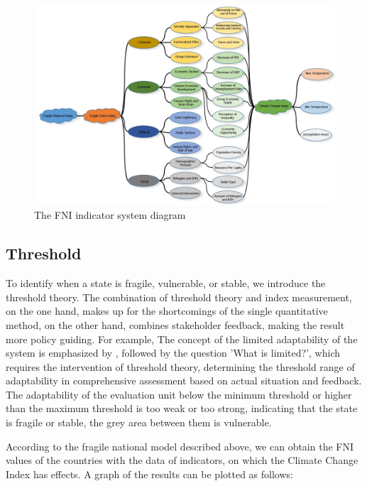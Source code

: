 \documentclass[a4paper,12pt]{article}
\begin{document}
\begin{figure} [H]
\centering
\includegraphics[width=\textwidth]{All.jpg}
\caption{The FNI indicator system diagram}%
\end{figure}

\subsection{Threshold}
\label{sec23}

To identify when a state is fragile, vulnerable, or stable, we introduce the threshold theory. The combination of threshold theory and index measurement, on the one hand, makes up for the shortcomings of the single quantitative method, on the other hand, combines stakeholder feedback, making the result more policy guiding. For example, The concept of the limited adaptability of the system is emphasized by \cite{polsky2007building}, followed by the question 'What is limited?', which requires the intervention of threshold theory, determining the threshold range of adaptability in comprehensive assessment based on actual situation and feedback. The adaptability of the evaluation unit below the minimum threshold or higher than the maximum threshold is too weak or too strong, indicating that the state is fragile or stable, the grey area between them is vulnerable.

According to the fragile national model described above, we can obtain the FNI values of the countries with the data of indicators, on which the Climate Change Index has effects. A graph of the results can be plotted as follows:
\end{document}
